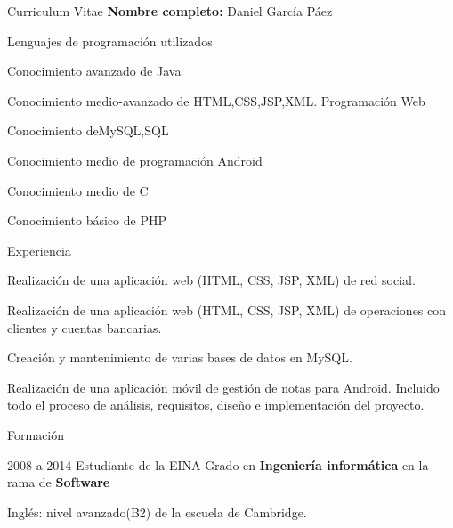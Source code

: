 \begin{cv}{Curriculum Vitae}
\vspace{1cm}
\textbf{Nombre completo:} Daniel García Páez
\vspace{1cm}

\begin{cvlist}{Lenguajes de programación utilizados}
\item Conocimiento avanzado de Java
\item Conocimiento medio-avanzado de HTML,CSS,JSP,XML. Programación Web
\item Conocimiento deMySQL,SQL
\item Conocimiento medio de programación Android
\item Conocimiento medio de C
\item Conocimiento básico de PHP
\end{cvlist}

\begin{cvlist}{Experiencia}

	\item Realización de una aplicación web (HTML, CSS, JSP, XML) de red social.
	\item Realización de una aplicación web (HTML, CSS, JSP, XML) de operaciones con clientes y
cuentas bancarias.
	\item Creación y mantenimiento de varias bases de datos en MySQL.
	\item Realización de una aplicación móvil de gestión de notas para Android. Incluido todo el
proceso de análisis, requisitos, diseño e implementación del proyecto.

\end{cvlist}

\begin{cvlist}{Formación}

	\item[2008 a 2014] Estudiante de la EINA
		Grado en \textbf{Ingeniería informática} en la rama de \textbf{Software}\\
		\item Inglés: nivel avanzado(B2) de la escuela de Cambridge.


\end{cvlist}

\end{cv}